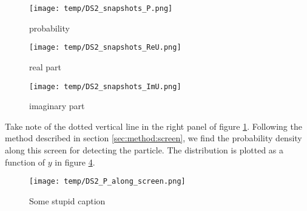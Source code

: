     \clearpage

    \newpage

    \onecolumngrid

    \begin{figure*}
        \centering
        \begin{subfigure}{0.92\textwidth}
            \texttt{[image: temp/DS2\_snapshots\_P.png]}
            \caption{probability}
            \label{fig:snapshots_p_DS2}
        \end{subfigure}
        \hfill
        \begin{subfigure}{0.92\textwidth}
            \texttt{[image: temp/DS2\_snapshots\_ReU.png]}
            \caption{real part}
            \label{fig:snapshots_ReU_DS2}
        \end{subfigure}
        \hfill
        \begin{subfigure}{0.92\textwidth}
            \texttt{[image: temp/DS2\_snapshots\_ImU.png]}
            \caption{imaginary part}
            \label{fig:snapshots_ImU_DS2}
        \end{subfigure}
        \caption{Colour maps showing }
        \label{fig:snapshots_DS2}
    \end{figure*}


    \twocolumngrid

    Take note of the dotted vertical line in the right panel of figure \ref{fig:snapshots_p_DS2}. Following the method described in section \ref{sec:method:screen}, we find the probability density along this screen for detecting the particle.  The distribution is plotted as a function of $y$ in figure \ref{fig:p_along_y_DS2}.



    \begin{figure}[ht!]
        \centering
        \texttt{[image: temp/DS2\_P\_along\_screen.png]}
        \caption{Some stupid caption}
        \label{fig:p_along_y_DS2}
    \end{figure}


